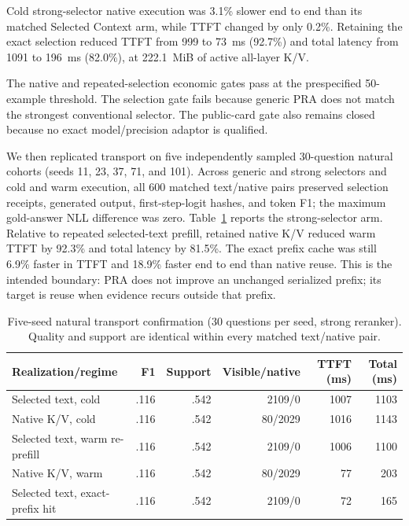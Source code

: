 \documentclass[11pt]{article}
\begin{document}
Cold strong-selector native execution was 3.1\% slower end to end than its
matched Selected Context arm, while TTFT changed by only 0.2\%. Retaining the
exact selection reduced TTFT from 999 to 73~ms (92.7\%) and total latency from
1091 to 196~ms (82.0\%), at 222.1~MiB of active all-layer K/V.

The native and repeated-selection economic gates pass at the prespecified
50-example threshold. The selection gate fails because generic PRA does not
match the strongest conventional selector. The public-card gate also remains
closed because no exact model/precision adaptor is qualified.

We then replicated transport on five independently sampled 30-question natural
cohorts (seeds 11, 23, 37, 71, and 101). Across generic and strong selectors and
cold and warm execution, all 600 matched text/native pairs preserved selection
receipts, generated output, first-step-logit hashes, and token F1; the maximum
gold-answer NLL difference was zero. Table~\ref{tab:natural-five-seed} reports
the strong-selector arm. Relative to repeated selected-text prefill, retained
native K/V reduced warm TTFT by 92.3\% and total latency by 81.5\%. The exact
prefix cache was still 6.9\% faster in TTFT and 18.9\% faster end to end than
native reuse. This is the intended boundary: PRA does not improve an unchanged
serialized prefix; its target is reuse when evidence recurs outside that prefix.

\begin{table}[ht]
\centering
\caption{Five-seed natural transport confirmation (30 questions per seed,
strong reranker). Quality and support are identical within every matched
text/native pair.}
\label{tab:natural-five-seed}
\small
\begin{tabular}{lrrrrr}
\toprule
Realization/regime & F1 & Support & Visible/native & TTFT (ms) & Total (ms) \\
\midrule
Selected text, cold & .116 & .542 & 2109/0 & 1007 & 1103 \\
Native K/V, cold & .116 & .542 & 80/2029 & 1016 & 1143 \\
Selected text, warm re-prefill & .116 & .542 & 2109/0 & 1006 & 1100 \\
Native K/V, warm & .116 & .542 & 80/2029 & 77 & 203 \\
Selected text, exact-prefix hit & .116 & .542 & 2109/0 & 72 & 165 \\
\bottomrule
\end{tabular}
\end{table}
\end{document}
